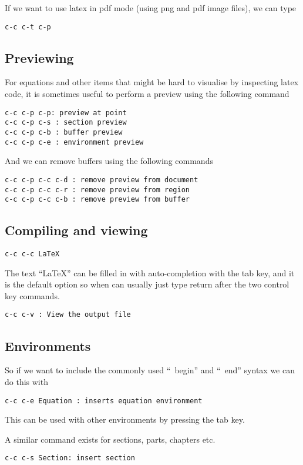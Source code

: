 \documentclass[a4paper, 10pt]{article}
\begin{document}
If we want to use latex in pdf mode (using png and pdf image files),
we can type
\begin{verbatim}
c-c c-t c-p
\end{verbatim}

\subsection{Previewing}
\label{sec:previewing}

For equations and other items that might be hard to visualise by
inspecting latex code, it is sometimes useful to perform a preview
using the following command
\begin{verbatim}
c-c c-p c-p: preview at point
c-c c-p c-s : section preview 
c-c c-p c-b : buffer preview
c-c c-p c-e : environment preview
\end{verbatim}

And we can remove buffers using the following commands
\begin{verbatim}
c-c c-p c-c c-d : remove preview from document
c-c c-p c-c c-r : remove preview from region
c-c c-p c-c c-b : remove preview from buffer
\end{verbatim}



\subsection*{Compiling and viewing}
\begin{verbatim}
c-c c-c LaTeX
\end{verbatim}
The text ``LaTeX'' can be filled in with auto-completion with the tab key, and it is the default option so when can usually just type return after the two control key commands.
\begin{verbatim}
c-c c-v : View the output file
\end{verbatim}

\subsection*{Environments}

So if we want to include the commonly used ``\ begin{}'' and ``\ end{}'' syntax we can do this with 
\begin{verbatim}
c-c c-e Equation : inserts equation environment
\end{verbatim}
This can be used with other environments by pressing the tab key.

A similar command exists for sections, parts, chapters etc.
\begin{verbatim}
c-c c-s Section: insert section  
\end{verbatim}
\end{document}
